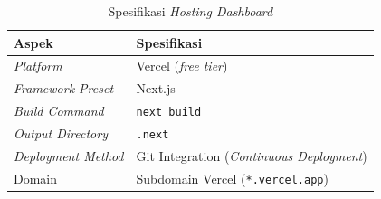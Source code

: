 \begin{table}[H]
  \caption{Spesifikasi \textit{Hosting Dashboard}}
  \label{tab:impl-hosting}
  \begin{tabularx}{\textwidth}{| l | X |}
    \hline
    \textbf{Aspek} & \textbf{Spesifikasi} \\
    \hline
    \textit{Platform} & Vercel (\textit{free tier}) \\
    \hline
    \textit{Framework Preset} & Next.js \\
    \hline
    \textit{Build Command} & \texttt{next build} \\
    \hline
    \textit{Output Directory} & \texttt{.next} \\
    \hline
    \textit{Deployment Method} & Git Integration (\textit{Continuous Deployment}) \\
    \hline
    Domain & Subdomain Vercel (\texttt{*.vercel.app}) \\
    \hline
  \end{tabularx}
\end{table}